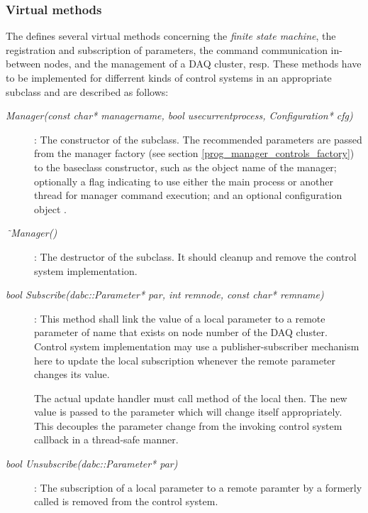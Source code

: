 \subsubsection{Virtual methods}
The  defines several virtual methods concerning the {\em finite state machine},
the registration and subscription of parameters, the command communication
in-between nodes, and the management of a DAQ cluster, resp.
These methods have to be implemented for differrent kinds of control systems in
an appropriate subclass and are described as follows:

\begin{description}

\item[\em Manager(const char* managername,  bool usecurrentprocess, Configuration* cfg)] :
The constructor of the subclass. The recommended parameters 
are passed from the manager factory (see section \ref{prog_manager_controls_factory})
to the baseclass constructor, such as
the object name of the manager; optionally a
flag indicating to use either the main process or another thread for manager 
command execution;
and an optional configuration object .

     
\item[\em\~{~}Manager()] :
The destructor of the subclass. It should cleanup and remove the  
control system implementation.    


\item[\em bool Subscribe(dabc::Parameter* par, int remnode, 
const char* remname)] :
This method shall link the value of a local parameter  to a remote parameter
of name  that exists on node number  of the DAQ
cluster. Control system implementation may use a publisher-subscriber mechanism here
to update the local subscription whenever the remote parameter changes its value.

The actual update handler must call method 
of the local  then.
The new value  is passed to the parameter which 
will change itself appropriately. This decouples the parameter change
from the invoking control system callback in a thread-safe manner.

\item[\em bool Unsubscribe(dabc::Parameter* par)] :
The subscription of a local parameter  to a remote paramter by
a formerly called  is removed from the control system.



\end{description}
